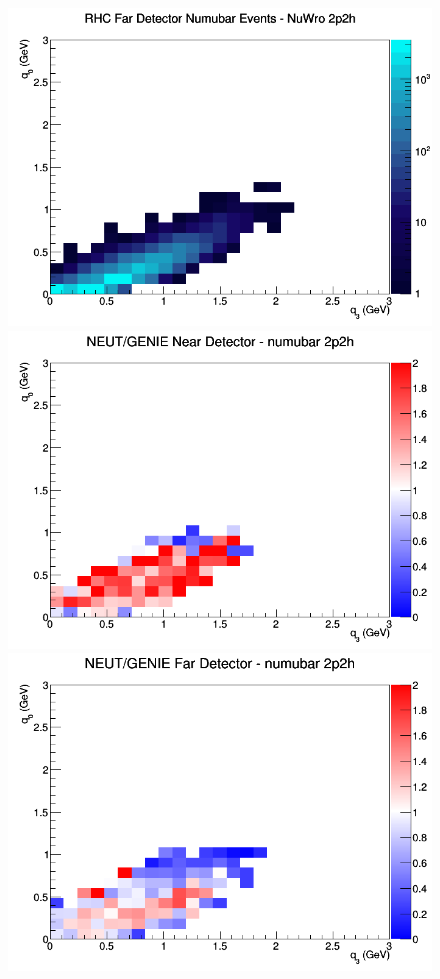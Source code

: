 \begin{figure}[h]
\endminipage
{}
\includegraphics[width=\linewidth]{eff_q0_q3/FGT/2p2h_RHC_FD_numubar_q3_q0_NuWro.png}
\endminipage
\newline
{}
\includegraphics[width=\linewidth]{eff_q0_q3/FGT/ratios/2p2h_NEUT_GENIE_numubar_near_q3_q0.png}
\endminipage
{}
\includegraphics[width=\linewidth]{eff_q0_q3/FGT/ratios/2p2h_NEUT_GENIE_numubar_far_q3_q0.png}

\end{figure}
